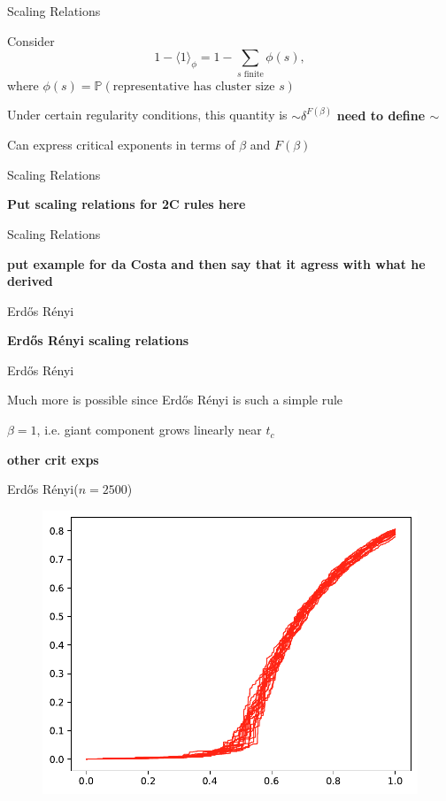 \documentclass{beamer}
\newcommand{\ang}[1]{\langle #1 \rangle}
\newcommand{\warn}[1]{\textbf{\color{red}#1}}
\newcommand{\ER}{Erd\H{o}s R\'enyi\xspace}
\newcommand{\nl}{
\vspace{5mm}

}
\begin{document}
\begin{frame}{Scaling Relations}
	
	Consider
	\[
	1 - \ang{1}_{\phi} = 1 - \sum_{s \text{ finite}} \phi(s),
	\] where $\phi(s) = \mathbb{P}( \text{representative has cluster size } s )$ \nl

	Under certain regularity conditions, this quantity is $\sim \delta^{F(\beta)}$ \warn{need to define $\sim$} \nl

	\pause
	Can express critical exponents in terms of $\beta$ and $F(\beta)$
\end{frame}

\begin{frame}{Scaling Relations}
	
	\warn{Put scaling relations for 2C rules here}
\end{frame}

\begin{frame}{Scaling Relations}
	
	\warn{put example for da Costa and then say that it agress with what he derived}
\end{frame}

\begin{frame}{\ER}
	
	\warn{\ER scaling relations}
\end{frame}

\begin{frame}{\ER}
	
	Much more is possible since \ER is such a simple rule \nl

	$\beta = 1$, i.e. giant component grows linearly near $t_{c}$ \nl

	\warn{other crit exps}
\end{frame}

\begin{frame}{\ER ($n =2500$)}

	\begin{figure}[H]
		\centering
		\includegraphics[scale=0.7]{fig/2500.pdf}
	\end{figure}
\end{frame}
\end{document}
